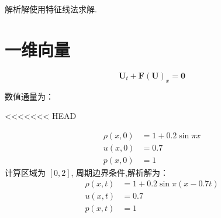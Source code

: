 \documentclass{book}
\begin{document}
\begin{example}
\begin{example}{}{}
\begin{example}
    解析解使用特征线法求解.
\end{example}




\section{一维向量}

\begin{equation}
    \mathbf{U}_{t}+\mathbf{F}(\mathbf{U})_{x}=\mathbf{0}
\end{equation}

数值通量为：

<<<<<<< HEAD
\begin{example}
    \begin{equation}
        \begin{aligned}
            \rho(x, 0) & =1+0.2 \sin \pi x \\
            u(x, 0)    & =0.7              \\
            p(x, 0)    & =1
        \end{aligned}
    \end{equation}
    计算区域为 $[0,2]$, 周期边界条件,解析解为：
    \begin{equation}
        \begin{aligned}
            \rho(x, t) & =1+0.2 \sin \pi(x-0.7 t) \\
            u(x, t)    & =0.7                     \\
            p(x, t)    & =1
        \end{aligned}
    \end{equation}



\end{example}
\end{example}
\end{example}
\end{document}
